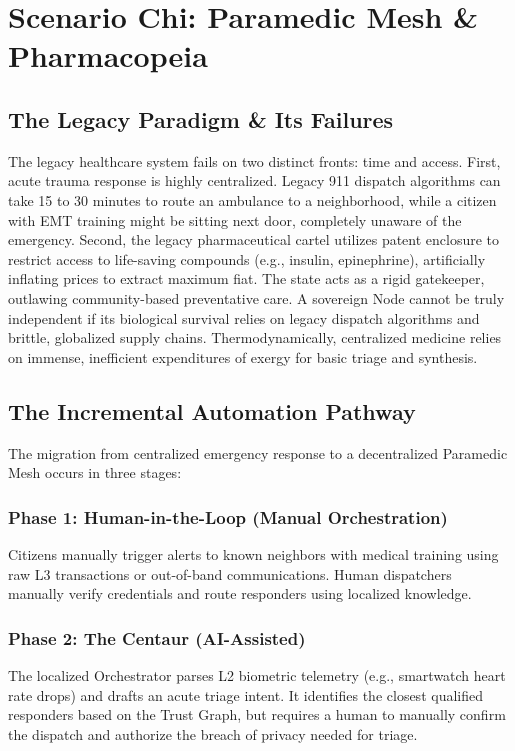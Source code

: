 \chapter{Scenario Chi: Paramedic Mesh \& Pharmacopeia}

\section{The Legacy Paradigm \& Its Failures}
The legacy healthcare system fails on two distinct fronts: time and access. First, acute trauma response is highly centralized. Legacy 911 dispatch algorithms can take 15 to 30 minutes to route an ambulance to a neighborhood, while a citizen with EMT training might be sitting next door, completely unaware of the emergency. Second, the legacy pharmaceutical cartel utilizes patent enclosure to restrict access to life-saving compounds (e.g., insulin, epinephrine), artificially inflating prices to extract maximum fiat. The state acts as a rigid gatekeeper, outlawing community-based preventative care. A sovereign Node cannot be truly independent if its biological survival relies on legacy dispatch algorithms and brittle, globalized supply chains. Thermodynamically, centralized medicine relies on immense, inefficient expenditures of exergy for basic triage and synthesis.

\section{The Incremental Automation Pathway}
The migration from centralized emergency response to a decentralized Paramedic Mesh occurs in three stages:

\subsection{Phase 1: Human-in-the-Loop (Manual Orchestration)}
Citizens manually trigger alerts to known neighbors with medical training using raw L3 transactions or out-of-band communications. Human dispatchers manually verify credentials and route responders using localized knowledge.

\subsection{Phase 2: The Centaur (AI-Assisted)}
The localized Orchestrator parses L2 biometric telemetry (e.g., smartwatch heart rate drops) and drafts an acute triage intent. It identifies the closest qualified responders based on the Trust Graph, but requires a human to manually confirm the dispatch and authorize the breach of privacy needed for triage.

